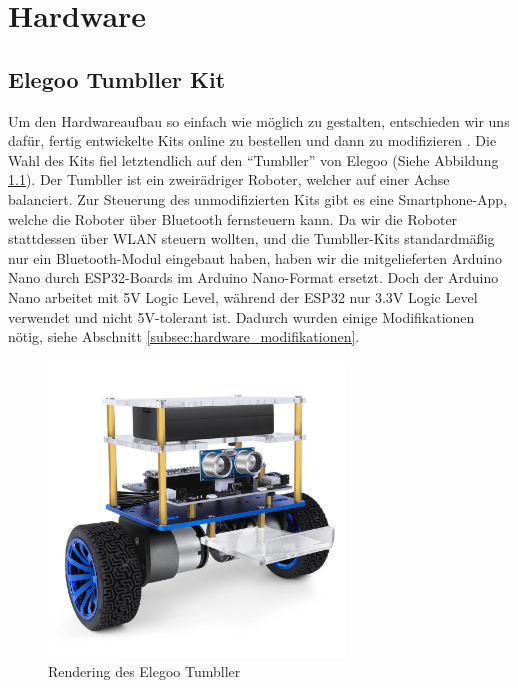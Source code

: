 \chapter{Hardware}
\label{sec:hardware}
\section{Elegoo Tumbller Kit}
\label{subsec:elegoo_tumbller}
Um den Hardwareaufbau so einfach wie möglich zu gestalten,
entschieden wir uns dafür,
fertig entwickelte Kits online zu bestellen und dann zu modifizieren \cite{elegoo-tumbller}.
%
Die Wahl des Kits fiel letztendlich auf den ``Tumbller'' von Elegoo (Siehe Abbildung \ref{fig:elegoo_tumbller}).
%
Der Tumbller ist ein zweirädriger Roboter, welcher auf einer Achse balanciert.
%
Zur Steuerung des unmodifizierten Kits gibt es eine Smartphone-App,
welche die Roboter über Bluetooth fernsteuern kann.
%
Da wir die Roboter stattdessen über WLAN steuern wollten, 
und die Tumbller-Kits standardmäßig nur ein Bluetooth-Modul eingebaut haben,
haben wir die mitgelieferten Arduino Nano durch ESP32-Boards im Arduino Nano-Format ersetzt.
Doch der Arduino Nano arbeitet mit 5V Logic Level,
während der  ESP32 nur 3.3V Logic Level verwendet und nicht 5V-tolerant ist.
Dadurch wurden einige Modifikationen nötig, siehe Abschnitt \ref{subsec:hardware_modifikationen}.
\begin{figure}[H]
    \includegraphics[width=0.7\textwidth, center]{img/elegoo_tumbller.png}
    \caption{Rendering des Elegoo Tumbller}
    \label{fig:elegoo_tumbller}
\end{figure}

